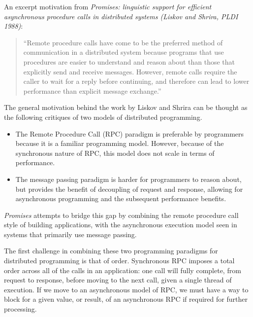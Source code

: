 An excerpt motivation from \textit{Promises: linguistic support for efficient asynchronous procedure calls in distributed systems (Liskov and Shrira, PLDI 1988)}:

\begin{quote}
``Remote procedure calls have come to be the preferred method of communication in a distributed system because programs that use procedures are easier to understand and reason about than those that explicitly send and receive messages. However, remote calls require the caller to wait for a reply before continuing, and therefore can lead to lower performance than explicit message exchange.''
\end{quote}

The general motivation behind the work by Liskov and Shrira can be thought as the following critiques of two models of distributed programming.
\begin{itemize}
	\item The Remote Procedure Call (RPC) paradigm is preferable by programmers because it is a familiar programming model.  However, because of the synchronous nature of RPC, this model does not scale in terms of performance.
	\item The message passing paradigm is harder for programmers to reason about, but provides the benefit of decoupling of request and response, allowing for asynchronous programming and the subsequent performance benefits.
\end{itemize}

\textit{Promises} attempts to bridge this gap by combining the remote procedure call style of building applications, with the asynchronous execution model seen in systems that primarily use  message passing.

The first challenge in combining these two programming paradigms for distributed programming is that of order.  Synchronous RPC imposes a total order across all of the calls in an application: one call will fully complete, from request to response, before moving to the next call, given a single thread of execution.  If we move to an asynchronous model of RPC, we must have a way to block for a given value, or result, of an asynchronous RPC if required for further processing.

